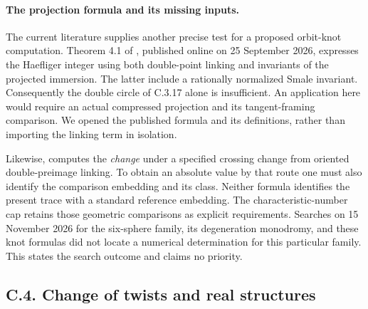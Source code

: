 \paragraph{The projection formula and its missing inputs.}
The current literature supplies another precise test for a proposed
orbit-knot computation. Theorem 4.1 of
\citet{GauniyalTurchin2026Root}, published online on
25 September 2026, expresses the Haefliger integer using both
double-point linking and invariants of the projected immersion.
The latter include a rationally normalized Smale invariant.
Consequently the double circle of C.3.17 alone is insufficient.
An application here would require an actual compressed projection
and its tangent-framing comparison. We opened the published
formula and its definitions, rather than importing the linking
term in isolation.

Likewise, \citet[Theorem 2.5]{Sakai2015Root} computes the
\emph{change} under a specified crossing change from oriented
double-preimage linking. To obtain an absolute value by that
route one must also identify the comparison embedding and its
class. Neither formula identifies the present trace with a
standard reference embedding. The characteristic-number cap
retains those geometric comparisons as explicit requirements.
Searches on 15 November 2026 for the six-sphere family,
its degeneration monodromy, and these knot formulas did not
locate a numerical determination for this particular family.
This states the search outcome and claims no priority.

\subsection{C.4. Change of twists and real structures}

